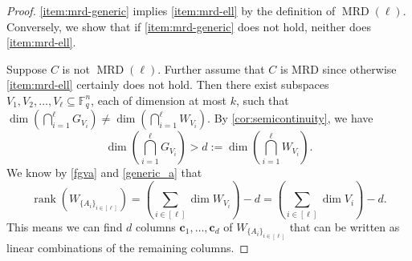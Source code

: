\documentclass[11pt]{article}
\theoremstyle{plain}
\theoremstyle{definition}
\theoremstyle{remark}
\newcommand{\F}{\mathbb{F}}
\begin{document}
\begin{proof}%
\cref{item:mrd-generic} implies \cref{item:mrd-ell} by the definition of $\operatorname{MRD}(\ell)$.
Conversely, we show that if \cref{item:mrd-generic} does not hold, neither does \cref{item:mrd-ell}. 

Suppose $C$ is not $\operatorname{MRD}(\ell)$. 
Further assume that $C$ is MRD since otherwise \cref{item:mrd-ell} certainly does not hold.
Then there exist subspaces $V_1,V_2,\dots,V_\ell\subseteq\F_q^n$, each of dimension at most $k$, such that $\dim\left(\bigcap_{i=1}^{\ell}G_{V_i}\right)\neq \dim\left(\bigcap_{i=1}^{\ell}W_{V_i}\right)$. 
By \cref{cor:semicontinuity}, we have
\begin{equation}\label{eq:intersection-lower-bound}
\dim\left(\bigcap_{i=1}^\ell G_{V_i}\right)>d:=\dim\left(\bigcap_{i=1}^\ell W_{V_i}\right).
\end{equation}
We know by \cref{fgva} and \cref{generic_a} that
\begin{equation}\label{ffo1}
    \operatorname{rank}\left(W_{\{A_i\}_{i\in[\ell]}}\right)=\left(\sum_{i\in[\ell]}\dim  W_{V_i}\right)-d=\left(\sum_{i\in[\ell]}\dim V_i\right)-d.
\end{equation}
This means we can find $d$ columns $\mathbf{c}_1,\dots,\mathbf{c}_d$ of $W_{\{A_i\}_{i\in[\ell]}}$ that can be written as linear combinations of the remaining columns. 

\end{proof}
\end{document}

